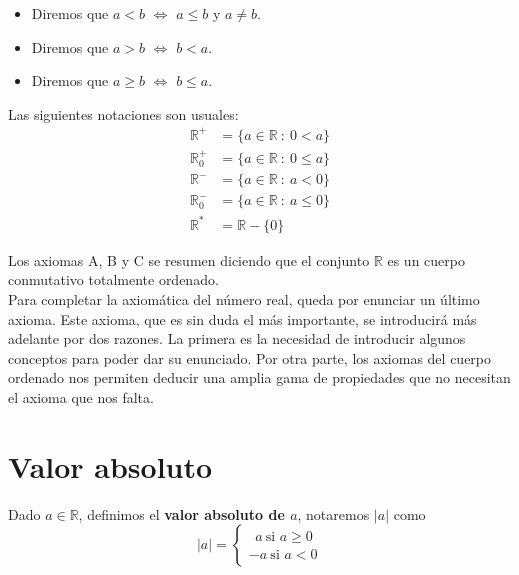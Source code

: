\begin{itemize}
    \item Diremos que $a < b$ $\Longleftrightarrow$ $a \leq b$ y $a \neq b$.
    \item Diremos que $a > b$ $\Longleftrightarrow$ $b < a$.
    \item Diremos que $a \geq b$ $\Longleftrightarrow$  $b \leq a$. 
\end{itemize}

\vspace{0.5cm}
Las siguientes notaciones son usuales:
\begin{equation*}\begin{split}
    \mathbb{R}^{+}&=\{a \in \mathbb{R}~:~0 < a\}\\
    \mathbb{R}_0^{+}&=\{a \in \mathbb{R}~:~0 \leq a\} \\
    \mathbb{R}^{-}&=\{a \in \mathbb{R}~:~a < 0\} \\
    \mathbb{R}_0^{-}&=\{a \in \mathbb{R}~:~a \leq 0\} \\
    \mathbb{R}^{*}&=\mathbb{R}-\{0\}
\end{split}\end{equation*}

Los axiomas A, B y C se resumen diciendo que el conjunto $\mathbb{R}$ es un cuerpo conmutativo totalmente ordenado.\\

Para completar la axiomática del número real, queda por enunciar un último axioma. Este axioma, que es sin duda el
más importante, se introducirá más adelante por dos razones. La primera es la necesidad de introducir algunos conceptos
para poder dar su enunciado. Por otra parte, los axiomas del cuerpo ordenado nos permiten deducir una
amplia gama de propiedades que no necesitan el axioma que nos falta.


\section{Valor absoluto}
\begin{definicion}
Dado $a \in \mathbb{R}$, definimos el \textbf{valor absoluto de $a$}, notaremos $|a|$ como
\begin{equation*}
    |a| =
    \left\{ \begin{array}{lcc}
        ~~a ~\text{si $a \geq 0$} \\
        -a ~\text{si $a < 0$}
        \end{array}
    \right.
\end{equation*}
\end{definicion}

